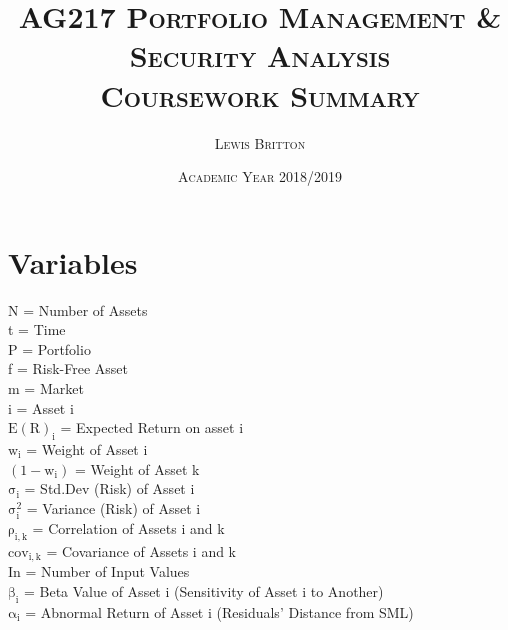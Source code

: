 \documentclass[11pt, english]{article}
\begin{document}

	\title{\textsc{AG217 Portfolio Management \& Security Analysis\\ Coursework Summary}}
        \author{\textsc{Lewis Britton}}
        \date{\textsc{Academic Year 2018/2019}}
        \maketitle

\newpage


        \renewcommand{\contentsname}{Table of Contents}

        \tableofcontents

\newpage


\section{Variables}

N = Number of Assets\\
t = Time\\

P = Portfolio\\
f = Risk-Free Asset\\
m = Market\\
i = Asset i\\

$\mathrm{E(R)_i}$ = Expected Return on asset i\\
$\mathrm{w_i}$ = Weight of Asset i\\
$\mathrm{(1-w_i)}$ = Weight of Asset k\\
$\mathrm{\sigma_i}$ = Std.Dev (Risk) of Asset i\\
$\mathrm{\sigma_i^2}$ = Variance (Risk) of Asset i\\
$\mathrm{\rho_{i,k}}$ = Correlation of Assets i and k\\
$\mathrm{cov_{i,k}}$ = Covariance of Assets i and k\\
In = Number of Input Values\\

$\mathrm{\beta_i}$ = Beta Value of Asset i (Sensitivity of Asset i to Another)\\
$\mathrm{\alpha_i}$ = Abnormal Return of Asset i (Residuals' Distance from SML)\\
\end{document}
